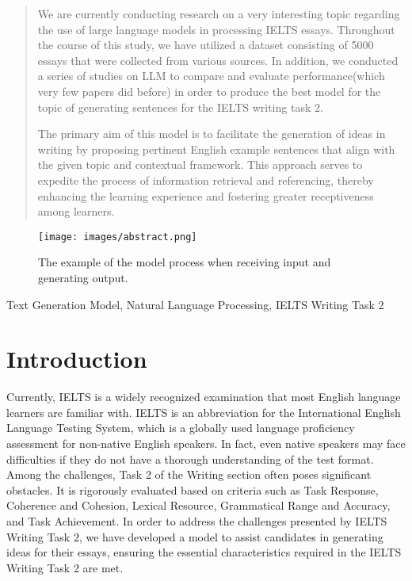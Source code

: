 \documentclass[conference]{IEEEtran}
\begin{document}
\maketitle
\thispagestyle{plain}
\pagestyle{plain}
\begin{abstract}

We are currently conducting research on a very interesting topic regarding the use of large language models in processing IELTS essays. Throughout the course of this study, we have utilized a dataset consisting of 5000 essays that were collected from various sources. In addition, we conducted a series of studies on LLM to compare and evaluate performance(which very few papers did before) in order to produce the best model for the topic of generating sentences for the IELTS writing task 2.

The primary aim of this model is to facilitate the generation of ideas in writing by proposing pertinent English example sentences that align with the given topic and contextual framework. This approach serves to expedite the process of information retrieval and referencing, thereby enhancing the learning experience and fostering greater receptiveness among learners.

\end{abstract}
\begin{figure}[htbp]
    \centerline{\texttt{[image: images/abstract.png]}}
    \caption{The example of the model process when receiving input and generating output.}
    \label{fig1:work_flow}
\end{figure}
\begin{IEEEkeywords}
Text Generation Model, Natural Language Processing, IELTS Writing Task 2
\end{IEEEkeywords}

\section{Introduction}

Currently, IELTS is a widely recognized examination that most English language learners are familiar with. IELTS is an abbreviation for the International English Language Testing System, which is a globally used language proficiency assessment for non-native English speakers. In fact, even native speakers may face difficulties if they do not have a thorough understanding of the test format. Among the challenges, Task 2 of the Writing section often poses significant obstacles. It is rigorously evaluated based on criteria such as Task Response, Coherence and Cohesion, Lexical Resource, Grammatical Range and Accuracy, and Task Achievement. In order to address the challenges presented by IELTS Writing Task 2, we have developed a model to assist candidates in generating ideas for their essays, ensuring the essential characteristics required in the IELTS Writing Task 2 are met.
\end{document}
